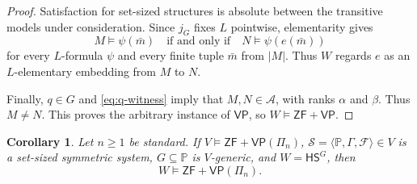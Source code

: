 \documentclass[11pt,a4paper]{amsart}
\newcommand{\VP}{\mathsf{VP}}
\newcommand{\ZF}{\mathsf{ZF}}
\newcommand{\HS}{\mathsf{HS}}
\theoremstyle{plain}
\newtheorem{corollary}[theorem]{Corollary}
\theoremstyle{definition}
\theoremstyle{remark}
\begin{document}
\begin{proof}
{Satisfaction for set-sized structures is absolute between the transitive models under consideration.  Since $j_G$ fixes $L$ pointwise, elementarity gives}
\[
M\models\psi(\bar m)\quad\text{if and only if}\quad
N\models\psi(e(\bar m))
\]
{for every $L$-formula $\psi$ and every finite tuple $\bar m$ from $|M|$.  Thus $W$ regards $e$ as an $L$-elementary embedding from $M$ to $N$.}

Finally, $q\in G$ and \eqref{eq:q-witness} imply that $M,N\in\mathcal A$, with ranks $\alpha$ and $\beta$.  Thus $M\neq N$.  This proves the arbitrary instance of $\VP$, so $W\models\ZF+\VP$.
\end{proof}

\begingroup

\begin{corollary}\label{cor:Pi-preservation}
Let $n\geq1$ be standard.  If $V\models\ZF+\VP(\Pi_n)$, $\mathscr S=\langle\mathbb P,\Gamma,\mathcal F\rangle\in V$ is a set-sized symmetric system, $G\subseteq\mathbb P$ is $V$-generic, and $W=\HS^G$, then
\[
W\models\ZF+\VP(\Pi_n).
\]
\end{corollary}
\end{document}
